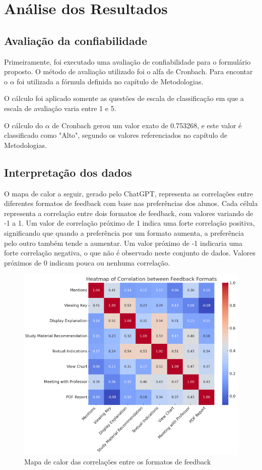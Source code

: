\chapter{Análise dos Resultados}

\section{Avaliação da confiabilidade}

Primeiramente, foi executado uma avaliação de confiabilidade para o formulário proposto. O método de avaliação utilizado foi o alfa de Cronbach. Para encontar o $\alpha$ foi utilizada a fórmula definida no capítulo de Metodologias.

O cálculo foi aplicado somente as questões de escala de classificação em que a escala de avaliação varia entre 1 e 5.

O cálculo do $\alpha$ de Cronbach gerou um valor exato de 0.753268, e este valor é classificado como "Alto", segundo os valores referenciados no capítulo de Metodologias. 

\section{Interpretação dos dados}

O mapa de calor a seguir, gerado pelo ChatGPT, representa as correlações entre diferentes formatos de feedback com base nas preferências dos alunos. Cada célula representa a correlação entre dois formatos de feedback, com valores variando de -1 a 1. Um valor de correlação próximo de 1 indica uma forte correlação positiva, significando que quando a preferência por um formato aumenta, a preferência pelo outro também tende a aumentar. Um valor próximo de -1 indicaria uma forte correlação negativa, o que não é observado neste conjunto de dados. Valores próximos de 0 indicam pouca ou nenhuma correlação.

\begin{figure}[H]
\centering
\includegraphics{figuras/heatmapfeedback.png}
\caption{Mapa de calor das correlações entre os formatos de feedback}
\end{figure}

